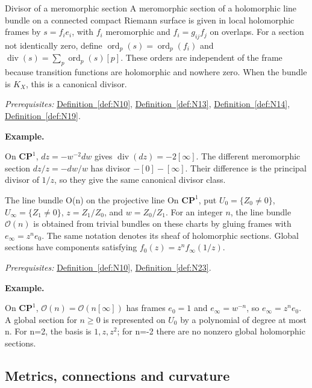 \documentclass[11pt]{article}
\makeatletter
\newcounter{definition}
\newcommand{\CP}{\mathbf{CP}}
\newcommand{\exampleheading}{\par\medskip\textbf{Example.}\par\smallskip}
\newcommand{\currentdefinition}[1]{\protected@edef\@currentlabel{#1}}
\makeatother
\begin{document}
\begin{definitionbox}{Divisor of a meromorphic section}
\currentdefinition{\thedefinition}
\label{def:N20}
A meromorphic section of a holomorphic line bundle on a connected compact Riemann surface is given in local holomorphic frames by $s=f_ie_i$, with $f_i$ meromorphic and $f_i=g_{ij}f_j$ on overlaps. For a section not identically zero, define $\operatorname{ord}_p(s)=\operatorname{ord}_p(f_i)$ and $\operatorname{div}(s)=\sum_p\operatorname{ord}_p(s)[p]$. These orders are independent of the frame because transition functions are holomorphic and nowhere zero. When the bundle is $K_X$, this is a canonical divisor.

\smallskip
\textit{Prerequisites:} \hyperref[def:N10]{Definition~\ref*{def:N10}}, \hyperref[def:N13]{Definition~\ref*{def:N13}}, \hyperref[def:N14]{Definition~\ref*{def:N14}}, \hyperref[def:N19]{Definition~\ref*{def:N19}}.

\exampleheading
On $\CP^1$, $dz=-w^{-2}dw$ gives $\operatorname{div}(dz)=-2[\infty]$. The different meromorphic section $dz/z=-dw/w$ has divisor $-[0]-[\infty]$. Their difference is the principal divisor of $1/z$, so they give the same canonical divisor class.
\end{definitionbox}

\begin{definitionbox}{The line bundle O(n) on the projective line}
\currentdefinition{\thedefinition}
\label{def:N21}
On $\CP^1$, put $U_0=\{Z_0\ne0\}$, $U_\infty=\{Z_1\ne0\}$, $z=Z_1/Z_0$, and $w=Z_0/Z_1$. For an integer $n$, the line bundle $\mathcal O(n)$ is obtained from trivial bundles on these charts by gluing frames with $e_\infty=z^n e_0$. The same notation denotes its sheaf of holomorphic sections. Global sections have components satisfying $f_0(z)=z^n f_\infty(1/z)$.

\smallskip
\textit{Prerequisites:} \hyperref[def:N10]{Definition~\ref*{def:N10}}, \hyperref[def:N23]{Definition~\ref*{def:N23}}.

\exampleheading
On $\CP^1$, $\mathcal O(n)=\mathcal O(n[\infty])$ has frames $e_0=1$ and $e_\infty=w^{-n}$, so $e_\infty=z^n e_0$. A global section for $n\ge0$ is represented on $U_0$ by a polynomial of degree at most n. For n=2, the basis is $1,z,z^2$; for n=-2 there are no nonzero global holomorphic sections.
\end{definitionbox}

\subsection*{Metrics, connections and curvature}
\end{document}
